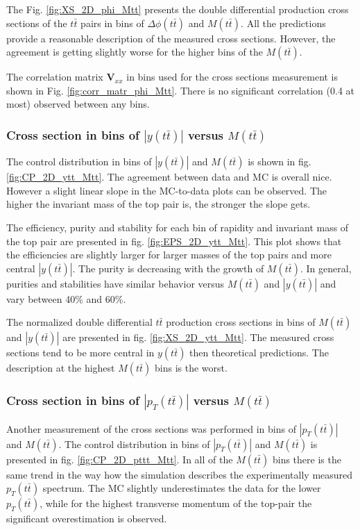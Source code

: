 The Fig. \ref{fig:XS_2D_phi_Mtt} presents the double differential production cross sections of the $t\bar{t}$ pairs in bins of $\Delta\phi(t\bar{t})$ and $M(t\bar{t})$.
All the predictions provide a reasonable description of the measured cross sections. However, the agreement is getting slightly worse for the higher bins of the $M(t\bar{t})$.

The correlation matrix $\mathbf{V}_{xx}$ in bins used for the cross sections measurement is shown in Fig. \ref{fig:corr_matr_phi_Mtt}. There is no significant correlation
(0.4 at most) observed between any bins.

\subsubsection{Cross section in bins of $|y(t\bar{t})|$ versus $M(t\bar{t})$}

The control distribution in bins of $|y(t\bar{t})|$ and $M(t\bar{t})$ is shown in fig. \ref{fig:CP_2D_ytt_Mtt}. The agreement between data and MC is overall nice.
However a slight linear slope in the MC-to-data plots can be observed. The higher the invariant mass of the top pair is, the stronger the slope gets.

The efficiency, purity and stability for each bin of rapidity and invariant mass of the top pair are presented in fig. \ref{fig:EPS_2D_ytt_Mtt}. This plot
shows that the efficiencies are slightly larger for larger masses of the top pairs and more central $|y(t\bar{t})|$. The purity is decreasing with the
growth of $M(t\bar{t})$. In general, purities and stabilities have similar behavior versus $M(t\bar{t})$ and $|y(t\bar{t})|$ and vary between 40\% and 60\%.

The normalized double differential $t\bar{t}$ production cross sections in bins of $M(t\bar{t})$ and $|y(t\bar{t})|$ are presented in fig. \ref{fig:XS_2D_ytt_Mtt}.
The measured cross sections tend to be more central in $y(t\bar{t})$ then theoretical predictions. The description at the highest $M(t\bar{t})$ bins is the worst.

\subsubsection{Cross section in bins of $|p_{T}(t\bar{t})|$ versus $M(t\bar{t})$}

Another measurement of the cross sections was performed in bins of $|p_{T}(t\bar{t})|$ and $M(t\bar{t})$.
The control distribution in bins of $|p_{T}(t\bar{t})|$ and $M(t\bar{t})$ is presented in fig. \ref{fig:CP_2D_pttt_Mtt}. In all of the $M(t\bar{t})$
bins there is the same trend in the way how the simulation describes the experimentally measured $p_{T}(t\bar{t})$ spectrum. The MC slightly underestimates
the data for the lower $p_{T}(t\bar{t})$, while for the highest transverse momentum of the top-pair the significant overestimation is observed.


